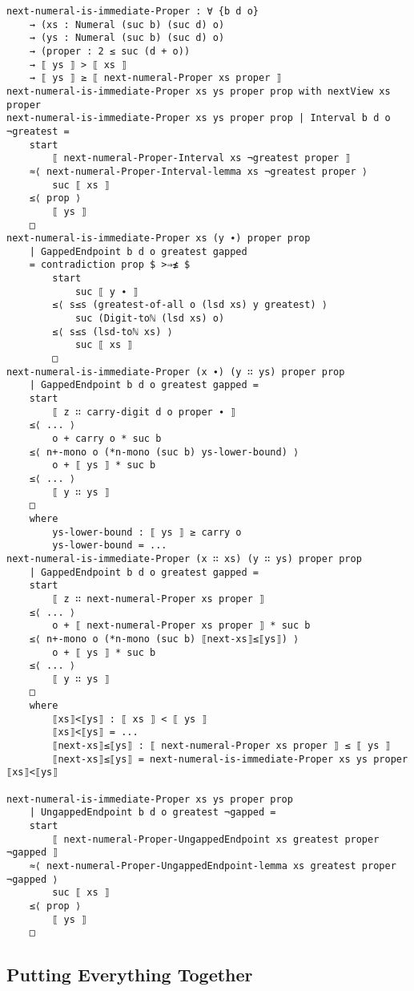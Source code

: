 \documentclass[\main/thesis.tex]{subfiles}
\begin{document}
\begin{lstlisting}[basicstyle=\ttfamily\scriptsize]
next-numeral-is-immediate-Proper : ∀ {b d o}
    → (xs : Numeral (suc b) (suc d) o)
    → (ys : Numeral (suc b) (suc d) o)
    → (proper : 2 ≤ suc (d + o))
    → ⟦ ys ⟧ > ⟦ xs ⟧
    → ⟦ ys ⟧ ≥ ⟦ next-numeral-Proper xs proper ⟧
next-numeral-is-immediate-Proper xs ys proper prop with nextView xs proper
next-numeral-is-immediate-Proper xs ys proper prop | Interval b d o ¬greatest =
    start
        ⟦ next-numeral-Proper-Interval xs ¬greatest proper ⟧
    ≈⟨ next-numeral-Proper-Interval-lemma xs ¬greatest proper ⟩
        suc ⟦ xs ⟧
    ≤⟨ prop ⟩
        ⟦ ys ⟧
    □
next-numeral-is-immediate-Proper xs (y ∙) proper prop
    | GappedEndpoint b d o greatest gapped
    = contradiction prop $ >⇒≰ $
        start
            suc ⟦ y ∙ ⟧
        ≤⟨ s≤s (greatest-of-all o (lsd xs) y greatest) ⟩
            suc (Digit-toℕ (lsd xs) o)
        ≤⟨ s≤s (lsd-toℕ xs) ⟩
            suc ⟦ xs ⟧
        □
next-numeral-is-immediate-Proper (x ∙) (y ∷ ys) proper prop
    | GappedEndpoint b d o greatest gapped =
    start
        ⟦ z ∷ carry-digit d o proper ∙ ⟧
    ≤⟨ ... ⟩
        o + carry o * suc b
    ≤⟨ n+-mono o (*n-mono (suc b) ys-lower-bound) ⟩
        o + ⟦ ys ⟧ * suc b
    ≤⟨ ... ⟩
        ⟦ y ∷ ys ⟧
    □
    where
        ys-lower-bound : ⟦ ys ⟧ ≥ carry o
        ys-lower-bound = ...
next-numeral-is-immediate-Proper (x ∷ xs) (y ∷ ys) proper prop
    | GappedEndpoint b d o greatest gapped =
    start
        ⟦ z ∷ next-numeral-Proper xs proper ⟧
    ≤⟨ ... ⟩
        o + ⟦ next-numeral-Proper xs proper ⟧ * suc b
    ≤⟨ n+-mono o (*n-mono (suc b) ⟦next-xs⟧≤⟦ys⟧) ⟩
        o + ⟦ ys ⟧ * suc b
    ≤⟨ ... ⟩
        ⟦ y ∷ ys ⟧
    □
    where
        ⟦xs⟧<⟦ys⟧ : ⟦ xs ⟧ < ⟦ ys ⟧
        ⟦xs⟧<⟦ys⟧ = ...
        ⟦next-xs⟧≤⟦ys⟧ : ⟦ next-numeral-Proper xs proper ⟧ ≤ ⟦ ys ⟧
        ⟦next-xs⟧≤⟦ys⟧ = next-numeral-is-immediate-Proper xs ys proper ⟦xs⟧<⟦ys⟧

next-numeral-is-immediate-Proper xs ys proper prop
    | UngappedEndpoint b d o greatest ¬gapped =
    start
        ⟦ next-numeral-Proper-UngappedEndpoint xs greatest proper ¬gapped ⟧
    ≈⟨ next-numeral-Proper-UngappedEndpoint-lemma xs greatest proper ¬gapped ⟩
        suc ⟦ xs ⟧
    ≤⟨ prop ⟩
        ⟦ ys ⟧
    □
\end{lstlisting}

\subsection{Putting Everything Together}
\end{document}
